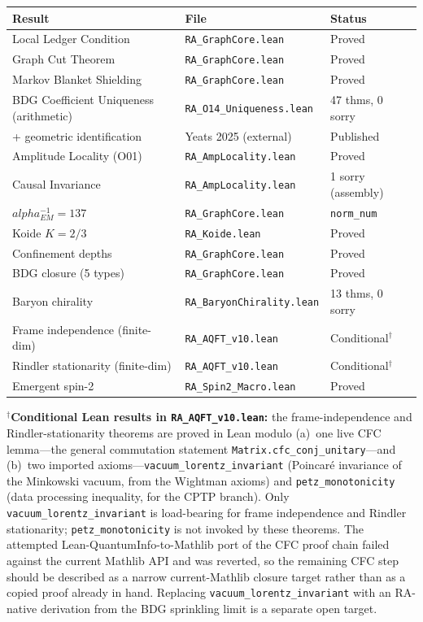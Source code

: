\documentclass[11pt]{article}
\def\alpha{alpha}%
\def\mathrm#1{#1}%
\begin{document}
\begin{center}
\begin{tabular}{lll}
\toprule
Result & File & Status \\
\midrule
Local Ledger Condition & \texttt{RA\_GraphCore.lean} & Proved \\
Graph Cut Theorem & \texttt{RA\_GraphCore.lean} & Proved \\
Markov Blanket Shielding & \texttt{RA\_GraphCore.lean} & Proved \\
BDG Coefficient Uniqueness (arithmetic) & \texttt{RA\_O14\_Uniqueness.lean} & 47 thms, 0 sorry \\
\quad + geometric identification & Yeats 2025 (external) & Published \\
Amplitude Locality (O01) & \texttt{RA\_AmpLocality.lean} & Proved \\
Causal Invariance & \texttt{RA\_AmpLocality.lean} & 1 sorry (assembly) \\
$\alpha_{\mathrm{EM}}^{-1}=137$ & \texttt{RA\_GraphCore.lean} & \texttt{norm\_num} \\
Koide $K=2/3$ & \texttt{RA\_Koide.lean} & Proved \\
Confinement depths & \texttt{RA\_GraphCore.lean} & Proved \\
BDG closure (5 types) & \texttt{RA\_GraphCore.lean} & Proved \\
Baryon chirality & \texttt{RA\_BaryonChirality.lean} & 13 thms, 0 sorry \\
Frame independence (finite-dim) & \texttt{RA\_AQFT\_v10.lean} & Conditional$^\dagger$ \\
Rindler stationarity (finite-dim) & \texttt{RA\_AQFT\_v10.lean} & Conditional$^\dagger$ \\
Emergent spin-2 & \texttt{RA\_Spin2\_Macro.lean} & Proved \\
\bottomrule
\end{tabular}
\end{center}

\noindent$^\dagger$\textbf{Conditional Lean results in \texttt{RA\_AQFT\_v10.lean}:} the frame-independence and Rindler-stationarity theorems are proved in Lean modulo (a)~one live CFC lemma---the general commutation statement \texttt{Matrix.cfc\_conj\_unitary}---and (b)~two imported axioms---\texttt{vacuum\_lorentz\_invariant} (Poincar\'e invariance of the Minkowski vacuum, from the Wightman axioms) and \texttt{petz\_monotonicity} (data processing inequality, for the CPTP branch). Only \texttt{vacuum\_lorentz\_invariant} is load-bearing for frame independence and Rindler stationarity; \texttt{petz\_monotonicity} is not invoked by these theorems. The attempted Lean-QuantumInfo-to-Mathlib port of the CFC proof chain failed against the current Mathlib API and was reverted, so the remaining CFC step should be described as a narrow current-Mathlib closure target rather than as a copied proof already in hand. Replacing \texttt{vacuum\_lorentz\_invariant} with an RA-native derivation from the BDG sprinkling limit is a separate open target.
\end{document}
